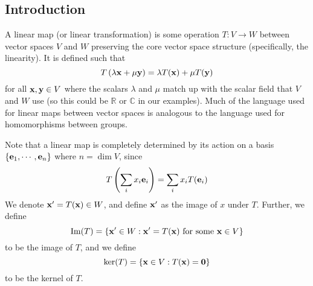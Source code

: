 \subsection{Introduction}
A linear map (or linear transformation) is some operation $T: V \to W$ between vector spaces $V$ and $W$ preserving the core vector space structure (specifically, the linearity). It is defined such that
\[ T\left(\lambda \vb x + \mu \vb y\right) = \lambda T(\vb x) + \mu T(\vb y) \]
for all $\vb x, \vb y \in V$ where the scalars $\lambda$ and $\mu$ match up with the scalar field that $V$ and $W$ use (so this could be $\mathbb R$ or $\mathbb C$ in our examples). Much of the language used for linear maps between vector spaces is analogous to the language used for homomorphisms between groups.

Note that a linear map is completely determined by its action on a basis $\{ \vb e_1, \cdots, \vb e_n \}$ where $n = \dim V$, since
\[ T\left(\sum_i x_i \vb e_i \right) = \sum_i x_i T(\vb e_i) \]
We denote $\vb x' = T(\vb x) \in W$, and define $\vb x'$ as the image of $x$ under $T$. Further, we define
\[ \Im (T) = \{ \vb x' \in W : \vb x' =T(\vb x) \text{ for some } \vb x \in V \} \]
to be the image of $T$, and we define
\[ \ker (T) = \{ \vb x \in V : T(\vb x) = \vb 0 \} \]
to be the kernel of $T$.

